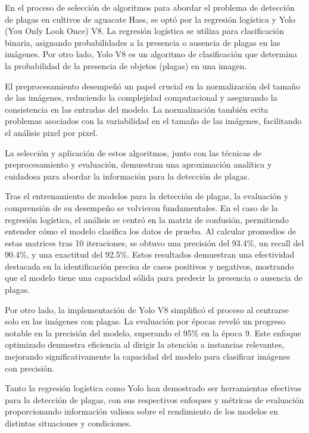 En el proceso de selección de algoritmos para abordar el problema de detección de plagas en cultivos de aguacate Hass, se optó por la regresión logística y Yolo (You Only Look Once) V8. La regresión logística se utiliza para clasificación binaria, asignando probabilidades a la presencia o ausencia de plagas en las imágenes. Por otro lado, Yolo V8 es un algoritmo de clasificación que determina la probabilidad de la presencia de objetos (plagas) en una imagen.

El preprocesamiento desempeñó un papel crucial en la normalización del tamaño de las imágenes, reduciendo la complejidad computacional y asegurando la consistencia en las entradas del modelo. La normalización también evita problemas asociados con la variabilidad en el tamaño de las imágenes, facilitando el análisis pixel por pixel.

La selección y aplicación de estos algoritmos, junto con las técnicas de preprocesamiento y evaluación, demuestran una aproximación analítica y cuidadosa para abordar la información para la detección de plagas.

Tras el entrenamiento de modelos para la detección de plagas, la evaluación y comprensión de su desempeño se volvieron fundamentales. En el caso de la regresión logística, el análisis se centró en la matriz de confusión, permitiendo entender cómo el modelo clasifica los datos de prueba. Al calcular promedios de estas matrices tras 10 iteraciones, se obtuvo una precisión del 93.4\%, un recall del 90.4\%, y una exactitud del 92.5\%. Estos resultados demuestran una efectividad destacada en la identificación precisa de casos positivos y negativos, mostrando que el modelo tiene una capacidad sólida para predecir la presencia o ausencia de plagas.

\newpage

Por otro lado, la implementación de Yolo V8 simplificó el proceso al centrarse solo en las imágenes con plagas. La evaluación por épocas reveló un progreso notable en la precisión del modelo, superando el 95\% en la época 9. Este enfoque optimizado demuestra eficiencia al dirigir la atención a instancias relevantes, mejorando significativamente la capacidad del modelo para clasificar imágenes con precisión.

Tanto la regresión logística como Yolo han demostrado ser herramientas efectivas para la detección de plagas, con sus respectivos enfoques y métricas de evaluación proporcionando información valiosa sobre el rendimiento de los modelos en distintas situaciones y condiciones. \newline

